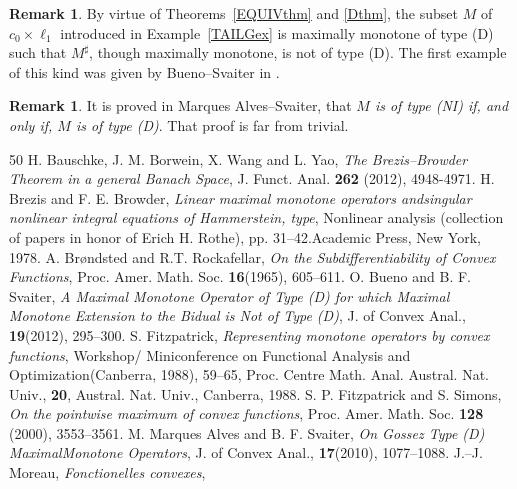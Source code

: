 \documentclass[letterpaper]{article}
\theoremstyle{plain}
\theoremstyle{definition}
\newtheorem{remark}[theorem]{Remark}
\numberwithin{equation}{section}
\newcommand{\Ex}{Example~\ref}
\newcommand{\Thms}{Theorems~\ref}
\begin{document}
%
\begin{remark}
By virtue of  \Thms{EQUIVthm} and \ref{Dthm}, the subset $M$ of $c_0 \times \ell_1$ introduced in \Ex{TAILGex} is maximally monotone of type (D) such that $M^\sharp$, though maximally monotone, is not of type (D).   The first example of this kind was given by Bueno--Svaiter in \cite[Proposition 3.2, p.\ 299]{OBS}.
\end{remark}

\begin{remark}
It is proved in Marques Alves--Svaiter, \cite[Theorem 4.4, pp.\ 1084--1085]{ASD} that {\em $M$ is of type (NI) if, and only if, $M$ is of type (D)}.   That proof is far from trivial.
\end{remark}
\begin{thebibliography}{50}
%
%
 H. Bauschke, J. M. Borwein, X. Wang and L. Yao, {\em The Brezis--Browder Theorem in a general Banach Space}, J. Funct. Anal. {\bf 262} (2012), 4948-4971. 
%
 H. Brezis and F. E. Browder, {\em  Linear maximal monotone operators and\break singular nonlinear integral equations of Hammerstein,  type}, Nonlinear analysis (collection of papers in honor of Erich H. Rothe),  pp. 31--42.\break Academic Press, New York, 1978.
%
 A. Br\o ndsted and R.T. Rockafellar, {\em On the Subdifferentiability of Convex Functions}, Proc. Amer. Math. Soc. {\bf 16}(1965), 605--611.
%
 O. Bueno and B. F. Svaiter, {\em A Maximal Monotone Operator of Type (D) for which Maximal Monotone Extension to the Bidual is Not of Type (D)}, J. of Convex Anal., {\bf 19}(2012), 295--300.
%
 S. Fitzpatrick, {\em Representing monotone operators by convex functions},   Workshop/ Miniconference on Functional Analysis and Optimization\break (Canberra, 1988),  59--65, Proc. Centre Math. Anal. Austral. Nat. Univ., {\bf 20}, Austral. Nat. Univ.,
Canberra, 1988.
%
%
S. P. Fitzpatrick and S. Simons, {\em On the pointwise maximum of convex functions}, Proc. Amer. Math. Soc. {\bf 128} (2000), 3553--3561.
%
%
M. Marques Alves and B. F. Svaiter, {\em On Gossez Type (D) Maximal\break Monotone Operators}, J. of Convex Anal., {\bf 17}(2010), 1077--1088.
%
J.--J. Moreau, {\em Fonctionelles convexes},

\end{thebibliography}
\end{document}
